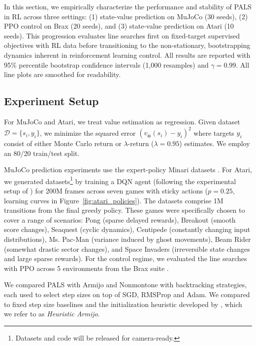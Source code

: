 \documentclass{article}
\renewcommand{\v}{v}
\newcommand{\vparams}{{\bm \phi}}
\newcommand{\vparam}{\v_\vparams}
\begin{document}
In this section, we empirically characterize the performance and stability of PALS in RL across three settings: (1) state-value prediction on MuJoCo (30 seeds), (2) PPO control on Brax (20 seeds), and (3) state-value prediction on Atari (10 seeds). This progression evaluates line searches first on fixed-target supervised objectives with RL data before transitioning to the non-stationary, bootstrapping dynamics inherent in reinforcement learning control. All results are reported with 95\% percentile bootstrap confidence intervals (1,000 resamples) and $\gamma = 0.99$. All line plots are smoothed for readability.


\subsection{Experiment Setup}
For MuJoCo and Atari, we treat value estimation as regression. Given dataset $\mathcal{D} = \{s_i, y_i\}$, we minimize the squared error $(\vparam(s_i) - y_i )^2$ 
where targets $y_i$ consist of either Monte Carlo return or $\lambda$-return ($\lambda=0.95$) estimates. We employ an 80/20 train/test split.

MuJoCo prediction experiments use the expert-policy Minari datasets \citep{minari}. For Atari, we generated datasets\footnote{Datasets and code will be released for camera-ready.} by training a DQN agent (following the experimental setup of \citep{castro18dopamine}) for 200M frames across seven games with sticky actions ($p=0.25$, learning curves in Figure~\ref{fig:atari_policies}). The datasets comprise 1M transitions from the final greedy policy. These games were specifically chosen to cover a range of scenarios: Pong (sparse delayed rewards), Breakout (smooth score changes), Seaquest (cyclic dynamics), Centipede (constantly changing input distributions), Ms. Pac-Man (variance induced by ghost movements), Beam Rider (somewhat drastic sector changes), and Space Invaders (irreversible state changes and large sparse rewards).  
For the control regime, we evaluated the line searches with PPO \citep{schulman2017proximal} across 5 environments from the Brax suite \citep{brax2021github}. 

We compared PALS with Armijo and Nonmontone with backtracking strategies, each used to select step sizes on top of SGD, RMSProp and Adam.
We compared to fixed step size baselines and the initialization heuristic developed by \cite{vaswani2019painless}, which we refer to as \textit{Heuristic Armijo}.
\end{document}
